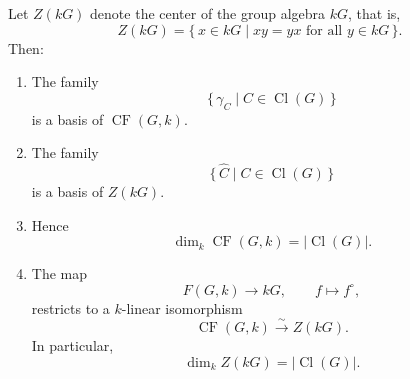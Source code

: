 \begin{lemma}
    Let \(Z(kG)\) denote the center of the group algebra \(kG\), that is,
    \[
        Z(kG)
        =
        \{\,x\in kG\mid xy=yx \text{ for all } y\in kG\,\}.
    \]
    Then:

    \begin{enumerate}
        \item The family
              \[
                  \{\,\gamma_C\mid C\in \operatorname{Cl}(G)\,\}
              \]
              is a basis of \(\operatorname{CF}(G,k)\).

        \item The family
              \[
                  \{\,\widehat{C}\mid C\in \operatorname{Cl}(G)\,\}
              \]
              is a basis of \(Z(kG)\).

        \item Hence
              \[
                  \dim_k \operatorname{CF}(G,k)
                  =
                  |\operatorname{Cl}(G)|.
              \]

        \item The map
              \[
                  F(G,k)\longrightarrow kG,
                  \qquad
                  f\longmapsto f^\circ,
              \]
              restricts to a \(k\)-linear isomorphism
              \[
                  \operatorname{CF}(G,k)
                  \xrightarrow{\sim}
                  Z(kG).
              \]
              In particular,
              \[
                  \dim_k Z(kG)=|\operatorname{Cl}(G)|.
              \]
    \end{enumerate}
\end{lemma}

